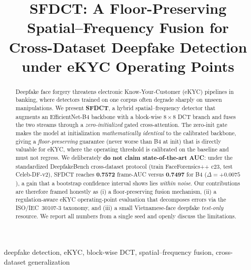 \documentclass[conference]{IEEEtran}
\begin{document}
\title{SFDCT: A Floor-Preserving Spatial--Frequency Fusion for\\
Cross-Dataset Deepfake Detection under eKYC Operating Points}

\author{
}

\maketitle

\begin{abstract}
Deepfake face forgery threatens electronic Know-Your-Customer (eKYC) pipelines in
banking, where detectors trained on one corpus often degrade sharply on unseen
manipulations. We present \textbf{SFDCT}, a hybrid spatial--frequency detector that augments an
EfficientNet-B4 backbone with a block-wise $8{\times}8$ DCT branch and fuses the two streams
through a \emph{zero-initialized} gated cross-attention. The zero-init gate makes the model at
initialization \emph{mathematically identical} to the calibrated backbone, giving a
\emph{floor-preserving} guarantee (never worse than B4 at init) that is directly valuable for
eKYC, where the operating threshold is calibrated on the baseline and must not regress.
We deliberately \textbf{do not claim state-of-the-art AUC}: under the standardized
DeepfakeBench cross-dataset protocol (train FaceForensics++ c23, test Celeb-DF-v2), SFDCT
reaches \textbf{0.7572} frame-AUC versus \textbf{0.7497} for B4 ($\Delta{=}{+}0.0075$), a gain that a
bootstrap confidence interval shows lies \emph{within noise}. Our contributions are therefore framed
honestly as (i) a floor-preserving fusion mechanism, (ii) a regulation-aware eKYC operating-point
evaluation that decomposes errors via the ISO/IEC~30107-3 taxonomy, and (iii) a small Vietnamese-face
deepfake \emph{test-only} resource. We report all numbers from a single seed and openly discuss the
limitations.
\end{abstract}

\begin{IEEEkeywords}
deepfake detection, eKYC, block-wise DCT, spatial--frequency fusion, cross-dataset generalization
\end{IEEEkeywords}
\end{document}

